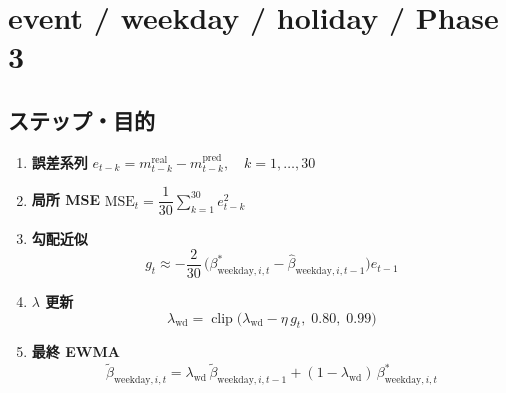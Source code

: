 
\section*{event / weekday / holiday / Phase 3}\nopagebreak[4]
\subsection*{ステップ・目的}
\begin{flushleft}
\begin{enumerate}
  \item \textbf{誤差系列}\;
        \( e_{t-k}=m_{t-k}^{\text{real}}-m_{t-k}^{\text{pred}},\quad k=1,\dots,30 \)

  \item \textbf{局所 MSE}\;
        \( \mathrm{MSE}_t=\dfrac{1}{30}\sum_{k=1}^{30}e_{t-k}^{2} \)

  \item \textbf{勾配近似}\;
        \[
          g_t \approx -\frac{2}{30}\,
            \bigl(\beta_{\text{weekday},i,t}^{\ast}
                  -\hat\beta_{\text{weekday},i,t-1}\bigr)
            e_{t-1}
        \]

  \item \textbf{$\lambda$ 更新}\;
        \[
          \lambda_{\text{wd}}
            =\operatorname{clip}\bigl(\lambda_{\text{wd}}-\eta\,g_t,\;0.80,\;0.99\bigr)
        \]

  \item \textbf{最終 EWMA}\;
        \[
          \tilde\beta_{\text{weekday},i,t}
            =\lambda_{\text{wd}}\,
             \tilde\beta_{\text{weekday},i,t-1}
            +(1-\lambda_{\text{wd}})\,
             \beta_{\text{weekday},i,t}^{\ast}
        \]
\end{enumerate}
\end{flushleft}

